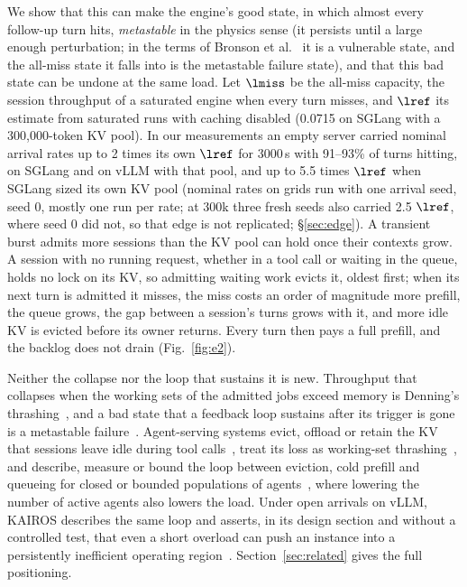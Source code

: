 We show that this can make the engine's good state, in which almost every follow-up turn hits, \emph{metastable} in the physics sense (it persists until a large enough perturbation; in the terms of Bronson et al.~\citep{bronson2021metastable} it is a vulnerable state, and the all-miss state it falls into is the metastable failure state), and that this bad state can be undone at the same load. Let $\lmiss$ be the all-miss capacity, the session throughput of a saturated engine when every turn misses, and $\lref$ its estimate from saturated runs with caching disabled (0.0715\sps{} on SGLang with a 300,000-token KV pool). In our measurements an empty server carried nominal arrival rates up to 2 times its own $\lref$ for 3000\,s with 91--93\% of turns hitting, on SGLang and on vLLM with that pool, and up to 5.5 times $\lref$ when SGLang sized its own KV pool (nominal rates on grids run with one arrival seed, seed 0, mostly one run per rate; at 300k three fresh seeds also carried 2.5 $\lref$, where seed 0 did not, so that edge is not replicated; \S\ref{sec:edge}). A transient burst admits more sessions than the KV pool can hold once their contexts grow. A session with no running request, whether in a tool call or waiting in the queue, holds no lock on its KV, so admitting waiting work evicts it, oldest first; when its next turn is admitted it misses, the miss costs an order of magnitude more prefill, the queue grows, the gap between a session's turns grows with it, and more idle KV is evicted before its owner returns. Every turn then pays a full prefill, and the backlog does not drain (Fig.~\ref{fig:e2}).

Neither the collapse nor the loop that sustains it is new. Throughput that collapses when the working sets of the admitted jobs exceed memory is Denning's thrashing~\citep{denning1968thrashing,denning1968working}, and a bad state that a feedback loop sustains after its trigger is gone is a metastable failure~\citep{bronson2021metastable,huang2022metastable}. Agent-serving systems evict, offload or retain the KV that sessions leave idle during tool calls~\citep{li2025continuum,abhyankar2024infercept,xia2026mori,bian2025tokencake,biswas2026sutradhara}, treat its loss as working-set thrashing~\citep{kang2026thunderagent,dhanani2026dynamo,shao2026efficientagent}, and describe, measure or bound the loop between eviction, cold prefill and queueing for closed or bounded populations of agents~\citep{hong2026misat,chen2026concur,yuan2026agentic,kim2026vamp,anon2026agentkv}, where lowering the number of active agents also lowers the load. Under open arrivals on vLLM, KAIROS describes the same loop and asserts, in its design section and without a controlled test, that even a short overload can push an instance into a persistently inefficient operating region~\citep{yuan2026kairos}. Section~\ref{sec:related} gives the full positioning.

